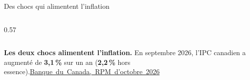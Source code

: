 \documentclass[aspectratio=169]{beamer}
\begin{document}
\begin{frame}[label=chocs-canada]{Des chocs qui alimentent l'inflation}
\begin{columns}[c,onlytextwidth]
\begin{column}{0.57\textwidth}
\end{column}
\end{columns}
\begin{tcolorbox}[colback=HECgreen!7, colframe=HECgreen!7, boxrule=0pt, arc=7pt, left=8pt, right=8pt, top=4pt, bottom=4pt]
\RaggedRight\small\textbf{Les deux chocs alimentent l’inflation.} En septembre 2026, l’IPC canadien a augmenté de \textbf{3,1\,\%} sur un an (\textbf{2,2\,\%} hors essence).\hfill{\scriptsize\mbox{\href{https://www.banqueducanada.ca/publication/rpm/rpm-2026-10-28/conjoncture-canadienne/}{Banque du Canada, RPM d’octobre 2026}}}
\end{tcolorbox}
\end{frame}

\end{document}
